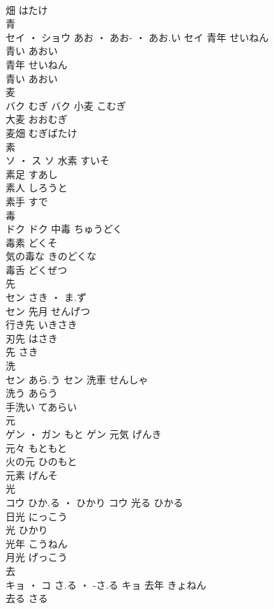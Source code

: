 \documentclass[8pt]{extreport}
\begin{document}
\begin{CJK}{UTF8}{min}
\\	畑	はたけ	
\\	青	
\\	セイ ・ ショウ	あお ・ あお- ・ あお.い	セイ	青年	せいねん	
\\	青い	あおい	
\\	青年	せいねん	
\\	青い	あおい	
\\	麦	
\\	バク	むぎ	バク	小麦	こむぎ	
\\	大麦	おおむぎ	
\\	麦畑	むぎばたけ	
\\	素	
\\	ソ ・ ス		ソ	水素	すいそ	
\\	素足	すあし	
\\	素人	しろうと	
\\	素手	すで	
\\	毒	
\\	ドク		ドク	中毒	ちゅうどく	
\\	毒素	どくそ	
\\	気の毒な	きのどくな	
\\	毒舌	どくぜつ	
\\	先	
\\	セン	さき ・ ま.ず
\\	セン	先月	せんげつ	
\\	行き先	いきさき	
\\	刃先	はさき	
\\	先	さき	
\\	洗	
\\	セン	あら.う	セン	洗車	せんしゃ	
\\	洗う	あらう	
\\	手洗い	てあらい	
\\	元	
\\	ゲン ・ ガン	もと	ゲン	元気	げんき	
\\	元々	もともと	
\\	火の元	ひのもと	
\\	元素	げんそ	
\\	光	
\\	コウ	ひか.る ・ ひかり	コウ	光る	ひかる	
\\	日光	にっこう	
\\	光	ひかり	
\\	光年	こうねん	
\\	月光	げっこう	
\\	去	
\\	キョ ・ コ	さ.る ・ -さ.る	キョ	去年	きょねん	
\\	去る	さる	

\end{CJK}
\end{document}
